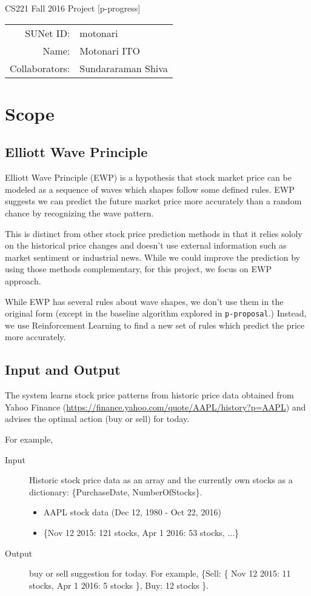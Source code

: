 \documentclass[12pt]{article}
\begin{document}
\begin{center}
{\Large CS221 Fall 2016 Project [p-progress]}

\begin{tabular}{rl}
SUNet ID: & motonari \\
Name: & Motonari ITO \\
Collaborators: & Sundararaman Shiva
\end{tabular}
\end{center}

\section{Scope}

\subsection{Elliott Wave Principle}

Elliott Wave Principle (EWP) is a hypothesis that stock market price
can be modeled as a sequence of waves which shapes follow some defined
rules. EWP suggests we can predict the future market price more
accurately than a random chance by recognizing the wave pattern.

This is distinct from other stock price prediction methods in that it
relies sololy on the historical price changes and doesn't use external
information such as market sentiment or industrial news. While we
could improve the prediction by using those methods complementary, for
this project, we focus on EWP approach.

While EWP has several rules about wave shapes, we don't use them in
the original form (except in the baseline algorithm explored in
\verb|p-proposal|.) Instead, we use Reinforcement Learning to find a
new set of rules which predict the price more accurately.

\subsection{Input and Output}

The system learns stock price patterns from historic price data
obtained from Yahoo Finance
(\url{https://finance.yahoo.com/quote/AAPL/history?p=AAPL}) and
advises the optimal action (buy or sell) for today.

For example,
\begin{description}
\item[Input] Historic stock price data as an array and the currently
  own stocks as a dictionary: \{PurchaseDate, NumberOfStocks\}.
  
  \begin{itemize}
  \item AAPL stock data (Dec 12, 1980 - Oct 22, 2016)
  \item \{Nov 12 2015: 121 stocks, Apr 1 2016: 53 stocks, ...\}
  \end{itemize}
\item[Output]
  buy or sell suggestion for today. For example, \{Sell: \{ Nov 12 2015: 11 stocks, Apr 1 2016: 5 stocks \}, Buy: 12 stocks \}.
\end{description}
\end{document}
